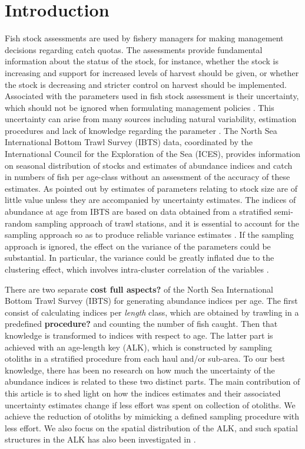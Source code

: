 \documentclass[a4paper 12pt]{article}
\numberwithin{equation}{section}
\begin{document}
\section{Introduction}
Fish stock assessments are used by fishery managers for making management decisions regarding catch quotas. The assessments provide fundamental information about the status of the stock, for instance, whether the stock is increasing and support for increased levels of harvest should be given, or whether the stock is decreasing and stricter control on harvest should be implemented. Associated with the parameters used in fish stock assessment is their uncertainty, which should not be ignored when formulating management policies \citep{walters1981effects, ludwig1981measurement}. This uncertainty can arise from many sources including natural variability, estimation procedures and lack of knowledge regarding the parameter \citep{ehrhardt1997role}. The North Sea International Bottom Trawl Survey (IBTS) data, coordinated by the International Council for the Exploration of the Sea (ICES), provides information on seasonal distribution of stocks and estimates of abundance indices and catch in numbers of fish per age-class without an assessment of the accuracy of these estimates.  As pointed out by  \citet{ludwig1981measurement} estimates of parameters relating to stock size are of little value unless they are accompanied by uncertainty estimates. The indices of abundance at age from IBTS  are based on data obtained from a stratified semi-random sampling approach of trawl stations,  and  it is essential to account for the sampling approach so as to produce reliable variance estimates \citep{lehtonen2004practical}. If the sampling approach is ignored, the effect on the variance  of the parameters could be substantial.  In particular, the variance could be greatly inflated  due to the clustering effect, which involves intra-cluster correlation of the variables \citep{aanes2015efficient, lehtonen2004practical}. 

There are two separate {\bf cost full aspects?} of the North Sea International Bottom Trawl Survey (IBTS) for generating abundance indices per age.  The first consist of calculating indices per \textit{length} class, which are obtained by trawling in a predefined {\bf procedure?} and counting the number of fish caught. Then that knowledge is transformed to indices with respect to age. The latter part is achieved with an age-length key (ALK), which is constructed by sampling otoliths in a stratified procedure from each haul and/or sub-area. To our best knowledge, there has been no research on how much the uncertainty of the abundance indices is related to these two distinct parts. The main contribution of this article is to shed light on how the indices estimates and their associated uncertainty estimates change if less effort was spent on collection of otoliths. We achieve the reduction of otoliths by mimicking a defined sampling procedure with less effort. We also focus on the spatial distribution of the ALK, and such spatial structures in the ALK has also been investigated in \citet{berg2012spatial, hirst2012bayesian}.
\end{document}

